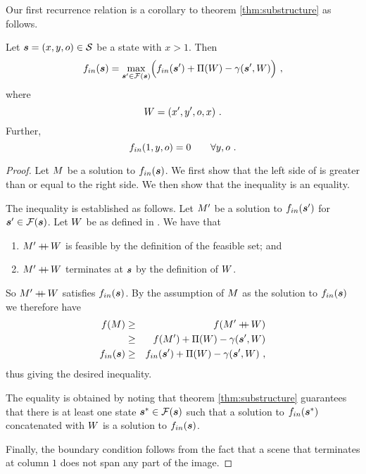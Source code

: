 Our first recurrence relation is a corollary to theorem
\ref{thm:substructure} as follows.
\begin{corollary}
  \label{cor:first-recurrence}
  Let $\State=(x,y,\WallOrient)\in\StateSpace$ be a state with
  $x>1$. Then
  \begin{equation}
    \label{eq:first-recurrence}
    \SubProbIN(\State) = 
    \max_{\State'\in\FeasibleSet(\State)}\limits
    \Bigl( 
      \SubProbIN(\State') + \WallPayoff(\Wall) - \CornerPenalty(\State',\Wall)
    \Bigr) ~,
  \end{equation}
  where
  \begin{equation}
    \label{eq:wall-def}
    \Wall=(x',y',\WallOrient,x) ~.
  \end{equation}
  Further,
  \begin{equation}
    \label{eq:first-boundary}
    \SubProbIN(1,y,\WallOrient) = 0 \quad\quad \forall y,\WallOrient ~.
  \end{equation}
\end{corollary}
\begin{proof}
  Let $\Scene$ be a solution to $\SubProbIN(\State)$. We first show
  that the left side of  is greater than or
  equal to the right side. We then show that the inequality is an
  equality.

  The inequality is established as follows. Let $\Scene'$ be a
  solution to $\SubProbIN(\State')$ for
  $\State'\in\FeasibleSet(\State)$. Let $\Wall$ be as defined in
  . We have that
  \begin{enumerate}
    \item{$\Scene'\concat\Wall$ is feasible by the definition of the
      feasible set; and}
    \item{$\Scene'\concat\Wall$ terminates at $\State$ by the definition
      of $\Wall$.}
  \end{enumerate}
  So $\Scene'\concat\Wall$ satisfies $\SubProbIN(\State)$. By the
  assumption of $\Scene$ as the solution to $\SubProbIN(\State)$ we
  therefore have
  \begin{eqnarray}
    \Objective(\Scene)
      &\geq&
    \Objective(\Scene'\concat\Wall)\\
      &\geq&
    \Objective(\Scene') + \WallPayoff(\Wall) -
    \CornerPenalty(\State',\Wall)\\
    \SubProbIN(\State)
      &\geq&
    \SubProbIN(\State') + \WallPayoff(\Wall) -
    \CornerPenalty(\State',\Wall) ~,
  \end{eqnarray}
  thus giving the desired inequality.

  The equality is obtained by noting that theorem
  \ref{thm:substructure} guarantees that there is at least one state
  $\State^*\in\FeasibleSet(\State)$ such that a solution to
  $\SubProbIN(\State^*)$ concatenated with $\Wall$ is a solution to
  $\SubProbIN(\State)$.

  Finally, the boundary condition  follows from
  the fact that a scene that terminates at column $1$ does not span
  any part of the image.
\end{proof}

